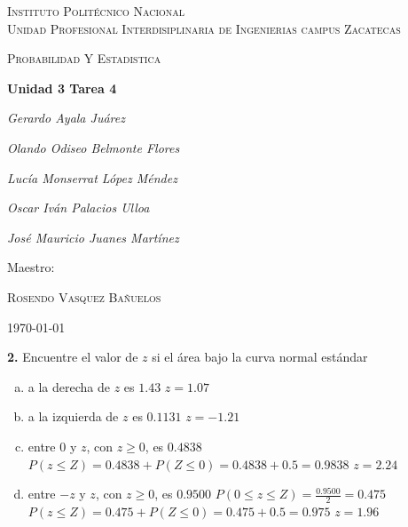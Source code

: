 \documentclass[12pt, letterpaper]{article}
\begin{document}
    \begin{titlepage}
        \centering
        {\scshape\LARGE Instituto Politécnico Nacional\\ Unidad Profesional Interdisiplinaria de Ingenierias campus Zacatecas\par}
        \vspace{1cm}
        {\scshape\Large Probabilidad Y Estadistica\par}
        \vspace{1.5cm}
        {\huge\bfseries Unidad 3 Tarea 4\par}
        \vspace{2cm}
        {\Large\itshape Gerardo Ayala Juárez\par}
        {\Large\itshape Olando Odiseo Belmonte Flores\par}
        {\Large\itshape Lucía Monserrat López Méndez\par}
        {\Large\itshape Oscar Iván Palacios Ulloa\par}
        {\Large\itshape José Mauricio Juanes Martínez\par}
        \vfill
        Maestro:\par
        \textsc{
        Rosendo Vasquez Bañuelos}
        \vfill
        {\large \today \par}
    \end{titlepage}

    \textbf{2. }Encuentre el valor de $z$ si el área bajo la curva normal estándar
        \begin{enumerate}[a)]
            \item a la derecha de $z$ es $1.43$\vskip0.5cm
                $z=1.07$
            \item a la izquierda de $z$ es $0.1131$\vskip0.5cm
                $z=-1.21$
            \item entre $0$ y $z$, con $z\geq 0$, es $0.4838$\vskip0.5cm
                $P(z\leq Z)=0.4838+P(Z\leq 0)=0.4838+0.5=0.9838$\vskip0.5cm
                $z=2.24$
            \item entre $-z$ y $z$, con $z\geq 0$, es $0.9500$\vskip0.5cm
                $P(0\leq z\leq Z)=\displaystyle\frac{0.9500}{2}=0.475$\vskip0.5cm
                $P(z\leq Z)=0.475+P(Z\leq 0)=0.475+0.5=0.975$\vskip0.5cm
                $z=1.96$
        \end{enumerate} \vskip1cm
\end{document}
